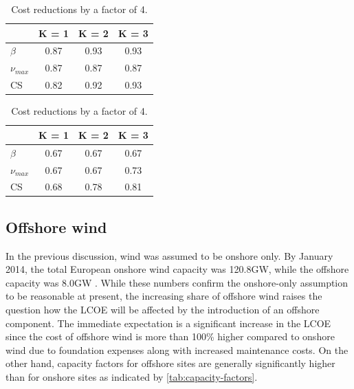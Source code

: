 \documentclass[a4paper, 5p, sort&compress]{elsarticle}%
\begin{document}
\begin{table}[h!]
  \centering
  \caption{Alpha values for optimal layouts for different scalings of
    the solar cost.}
  \label{tab:solar-alpha}
  \begin{subtable}{\columnwidth}
    \centering
    \caption{Cost reductions by a factor of 2.} 
    \begin{tabular}[h!]{l c c c}\toprule
      & K = 1 & K = 2 & K = 3 \\ \midrule
      $\beta$ & 0.87 & 0.93 & 0.93 \\ 
      $\nu_{max}$ & 0.87 & 0.87 & 0.87 \\ 
      CS & 0.82 & 0.92 & 0.93 \\ \bottomrule
    \end{tabular}
    \vspace{10pt}
  \end{subtable}
  \begin{subtable}{\columnwidth}
    \centering
    \caption{Cost reductions by a factor of 4.} 
  \begin{tabular}[h!]{l c c c}\toprule
    & K = 1 & K = 2 & K = 3 \\ \midrule
    $\beta$ & 0.67 & 0.67 & 0.67 \\ 
    $\nu_{max}$ & 0.67 & 0.67 & 0.73 \\ 
    CS & 0.68 & 0.78 & 0.81 \\ \bottomrule
  \end{tabular}
\end{subtable}
\end{table}

\subsection{Offshore wind}
\label{sec:offshore-wind}

In the previous discussion, wind was assumed to be onshore only. By
January 2014, the total European onshore wind capacity was 120.8GW,
while the offshore capacity was 8.0GW \cite{EWEA}. While these numbers
confirm the onshore-only assumption to be reasonable at present, the
increasing share of offshore wind raises the question how the LCOE
will be affected by the introduction of an offshore component. The
immediate expectation is a significant increase in the LCOE since the
cost of offshore wind is more than 100\% higher compared to onshore
wind due to foundation expenses along with increased maintenance
costs. On the other hand, capacity factors for offshore sites are
generally significantly higher than for onshore sites as indicated by
\cref{tab:capacity-factors}.
\end{document}
